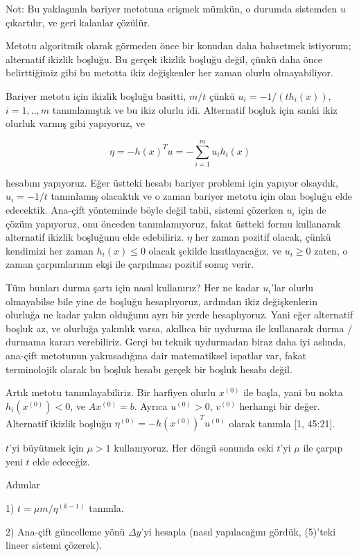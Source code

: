 \documentclass[12pt,fleqn]{article}\usepackage{../../common}
\begin{document}
Not: Bu yaklaşımla bariyer metotuna erişmek mümkün, o durumda sistemden $u$
çıkartılır, ve geri kalanlar çözülür. 

Metotu algoritmik olarak görmeden önce bir konudan daha bahsetmek
istiyorum; alternatif ikizlik boşluğu. Bu gerçek ikizlik boşluğu değil,
çünkü daha önce belirttiğimiz gibi bu metotta ikiz değişkenler her zaman
olurlu olmayabiliyor.

Bariyer metotu için ikizlik boşluğu basitti, $m/t$ çünkü
$u_i = -1 / (t h_i(x))$, $i=1,..,m$ tanımlamıştık ve bu ikiz olurlu idi.
Alternatif boşluk için sanki ikiz olurluk varmış gibi yapıyoruz, ve 

$$
\eta = -h(x)^T u = - \sum _{i=1}^{m} u_i h_i(x)
$$

hesabını yapıyoruz. Eğer üstteki hesabı bariyer problemi için yapıyor
olsaydık, $u_i = -1/t$ tanımlamış olacaktık ve o zaman bariyer metotu için
olan boşluğu elde edecektik. Ana-çift yönteminde böyle değil tabii, sistemi
çözerken $u_i$ için de çözüm yapıyoruz, onu önceden tanımlamıyoruz, fakat
üstteki formu kullanarak alternatif ikizlik boşluğunu elde edebiliriz.  
$\eta$ her zaman pozitif olacak, çünkü kendimizi her zaman $h_i(x) \le 0$
olacak şekilde kısıtlayacağız, ve $u_i \ge 0$ zaten, o zaman çarpımlarının
ekşi ile çarpılması pozitif sonuç verir.

Tüm bunları durma şartı için nasıl kullanırız? Her ne kadar $u_i$'lar
olurlu olmayabilse bile yine de boşluğu hesaplıyoruz, ardından ikiz
değişkenlerin olurluğa ne kadar yakın olduğunu ayrı bir yerde
hesaplıyoruz. Yani eğer alternatif boşluk az, ve olurluğa yakınlık varsa,
akıllıca bir uydurma ile kullanarak durma / durmama kararı verebiliriz.
Gerçi bu teknik uydurmadan biraz daha iyi aslında, ana-çift metotunun
yakınsadığına dair matematiksel ispatlar var, fakat terminolojik olarak bu
boşluk hesabı gerçek bir boşluk hesabı değil.

Artık metotu tanımlayabiliriz. Bir harfiyen olurlu $x^{(0)}$ ile başla,
yani bu nokta $h_i(x^{(0)}) < 0 $, ve $A x^{(0)}= b$. Ayrıca $u^{(0)} > 0$,
$v^{(0)}$ herhangi bir değer. Alternatif ikizlik boşluğu
$\eta^{(0)} = -h(x^{(0)})^T u^{(0)}$ olarak tanımla [1, 45:21].

$t$'yi büyütmek için $\mu > 1$ kullanıyoruz. Her döngü sonunda eski $t$'yi
$\mu$ ile çarpıp yeni $t$ elde edeceğiz.  

Adımlar

1) $t = \mu m / \eta^{(k-1)}$ tanımla. 

2) Ana-çift güncelleme yönü $\Delta y$'yi hesapla (nasıl yapılacağını
gördük, (5)'teki lineer sistemi çözerek).
\end{document}
